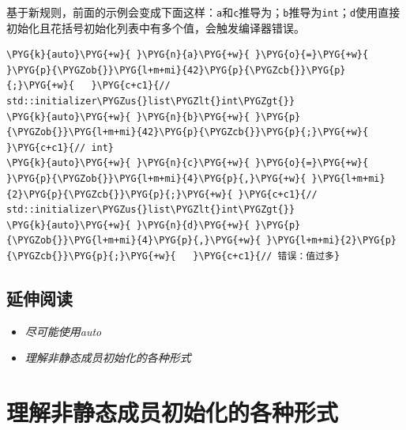 
基于新规则，前面的示例会变成下面这样：\texttt{a}和\texttt{c}推导为；\texttt{b}推导为\texttt{int}；\texttt{d}使用直接初始化且花括号初始化列表中有多个值，会触发编译器错误。



\begin{codeblockbg}
\begin{Verbatim}[commandchars=\\\{\},breaklines=true,breakanywhere=true,fontsize=\codefont,xleftmargin=17bp]
\PYG{k}{auto}\PYG{+w}{ }\PYG{n}{a}\PYG{+w}{ }\PYG{o}{=}\PYG{+w}{ }\PYG{p}{\PYGZob{}}\PYG{l+m+mi}{42}\PYG{p}{\PYGZcb{}}\PYG{p}{;}\PYG{+w}{   }\PYG{c+c1}{// std::initializer\PYGZus{}list\PYGZlt{}int\PYGZgt{}}
\PYG{k}{auto}\PYG{+w}{ }\PYG{n}{b}\PYG{+w}{ }\PYG{p}{\PYGZob{}}\PYG{l+m+mi}{42}\PYG{p}{\PYGZcb{}}\PYG{p}{;}\PYG{+w}{     }\PYG{c+c1}{// int}
\PYG{k}{auto}\PYG{+w}{ }\PYG{n}{c}\PYG{+w}{ }\PYG{o}{=}\PYG{+w}{ }\PYG{p}{\PYGZob{}}\PYG{l+m+mi}{4}\PYG{p}{,}\PYG{+w}{ }\PYG{l+m+mi}{2}\PYG{p}{\PYGZcb{}}\PYG{p}{;}\PYG{+w}{ }\PYG{c+c1}{// std::initializer\PYGZus{}list\PYGZlt{}int\PYGZgt{}}
\PYG{k}{auto}\PYG{+w}{ }\PYG{n}{d}\PYG{+w}{ }\PYG{p}{\PYGZob{}}\PYG{l+m+mi}{4}\PYG{p}{,}\PYG{+w}{ }\PYG{l+m+mi}{2}\PYG{p}{\PYGZcb{}}\PYG{p}{;}\PYG{+w}{   }\PYG{c+c1}{// 错误：值过多}
\end{Verbatim}
\end{codeblockbg}



\subsection{延伸阅读}



\begin{itemize}
\item \textit{尽可能使用auto}



\item \textit{理解非静态成员初始化的各种形式}

\end{itemize}



\section{理解非静态成员初始化的各种形式}


